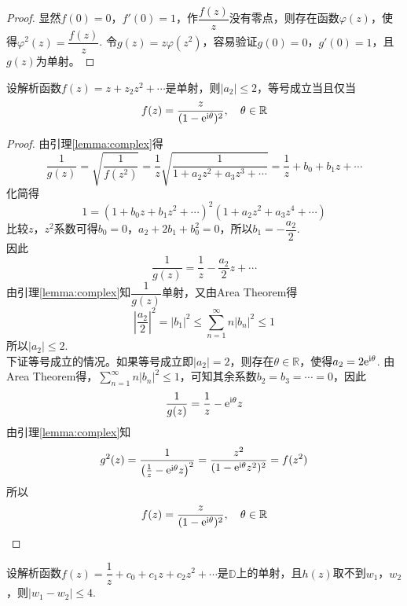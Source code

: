 \begin{proof}

    显然$f(0) = 0$，$f'(0) = 1$，作$\dfrac{f(z)}{z}$没有零点，则存在函数$\varphi(z)$，使得$\varphi^2(z) = \dfrac{f(z)}{z}$. 令$g(z) = z\varphi(z^2)$，容易验证$g(0) = 0$，$g'(0) = 1$，且$g(z)$为单射。
    
\end{proof}

\begin{theorem}\label{theorem:
    injective1}

    设解析函数$f(z) = z + z_2 z^2 + \cdots$是单射，则$|a_2| \leq 2$，等号成立当且仅当
    \[f(z) = \dfrac{z}{(1 - \mathrm{e}^{\mathrm{i} \theta})^2}, \quad \theta \in \mathbb{R}\]

\end{theorem}

\begin{proof}

    由引理\ref{lemma:complex}得
    \[\dfrac{1}{g(z)} = \sqrt{\dfrac{1}{f(z^2)}} = \dfrac{1}{z} \sqrt{\dfrac{1}{1 + a_2 z^2 + a_3 z^3 + \cdots}} = \dfrac{1}{z} + b_0 + b_1 z + \cdots\]
    化简得
    \[1 = (1 + b_0 z + b_1 z^2 + \cdots)^2 (1 + a_2 z^2 + a_3 z^4 + \cdots)\]
    比较$z$，$z^2$系数可得$b_0 = 0$，$a_2 + 2 b_1 + b_0^2 = 0$，所以$b_1 = -\dfrac{a_2}{2}$. \\
    因此
    \[\dfrac{1}{g(z)} = \dfrac{1}{z} - \dfrac{a_2}{2}z + \cdots\]
    由引理\ref{lemma:complex}知$\dfrac{1}{g(z)}$单射，又由\textup{Area Theorem}得
    \[\left| \dfrac{a_2}{2} \right|^2 = |b_1|^2 \leq \sum\limits_{n = 1}^{\infty}{n|b_n|^2} \leq 1\]
    所以$|a_2| \leq 2$. \\
    下证等号成立的情况。如果等号成立即$|a_2| = 2$，则存在$\theta \in \mathbb{R}$，使得$a_2 = 2 \mathrm{e}^{\mathrm{i} \theta}$. 由\textup{Area Theorem}得，$\sum\limits_{n = 1}^{\infty}{n|b_n|^2} \leq 1$，可知其余系数$b_2 = b_3 = \cdots = 0$，因此
    \[\dfrac{1}{g(z)} = \dfrac{1}{z} - \mathrm{e}^{\mathrm{i} \theta}z\]
    由引理\ref{lemma:complex}知
    \[g^2(z) = \dfrac{1}{\left( \frac{1}{z} - \mathrm{e}^{\mathrm{i} \theta}z \right)^2} = \dfrac{z^2}{(1 - \mathrm{e}^{\mathrm{i} \theta} z^2)^2} = f(z^2)\]
    所以
    \[f(z) = \dfrac{z}{(1 - \mathrm{e}^{\mathrm{i} \theta})^2}, \quad \theta \in \mathbb{R}\]

\end{proof}

\begin{theorem}\label{theorem:injective2}

    设解析函数$f(z) = \dfrac{1}{z} + c_0 + c_1 z + c_2 z^2 + \cdots$是$\mathbb{D}$上的单射，且$h(z)$取不到$w_1$，$w_2$，则$|w_1 - w_2| \leq 4$.

\end{theorem}

